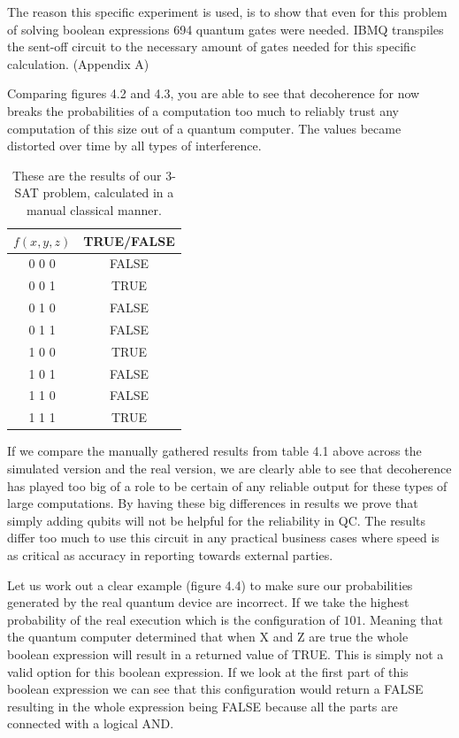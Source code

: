 The reason this specific experiment is used, is to show that even for this problem of solving boolean expressions 694 quantum gates were needed. IBMQ transpiles the sent-off circuit to the necessary amount of gates needed for this specific calculation. (Appendix A)

Comparing figures 4.2 and 4.3, you are able to see that decoherence for now breaks the probabilities of a computation too much to reliably trust any computation of this size out of a quantum computer. The values became distorted over time by all types of interference.

\begin{table}
	\centering
	\begin{tabular}{|| c c ||}
		\hline
		$f(x,y,z)$ & TRUE/FALSE \\
		\hline\hline
		0 0 0 & FALSE \\ 
		0 0 1 & TRUE \\
		0 1 0 & FALSE \\
		0 1 1 & FALSE \\
		1 0 0 & TRUE \\
		1 0 1 & FALSE \\
		1 1 0 & FALSE \\
		1 1 1 & TRUE \\
		\hline
	\end{tabular}
\caption{These are the results of our 3-SAT problem, calculated in a manual classical manner.}
\end{table}

If we compare the manually gathered results from table 4.1 above across the simulated version and the real version, we are clearly able to see that decoherence has played too big of a role to be certain of any reliable output for these types of large computations. By having these big differences in results we prove that simply adding qubits will not be helpful for the reliability in QC. The results differ too much to use this circuit in any practical business cases where speed is as critical as accuracy in reporting towards external parties.

Let us work out a clear example (figure 4.4) to make sure our probabilities generated by the real quantum device are incorrect. If we take the highest probability of the real execution which is the configuration of $101$. Meaning that the quantum computer determined that when X and Z are true the whole boolean expression will result in a returned value of TRUE. This is simply not a valid option for this boolean expression. If we look at the first part of this boolean expression we can see that this configuration would return a FALSE resulting in the whole expression being FALSE because all the parts are connected with a logical AND. 

